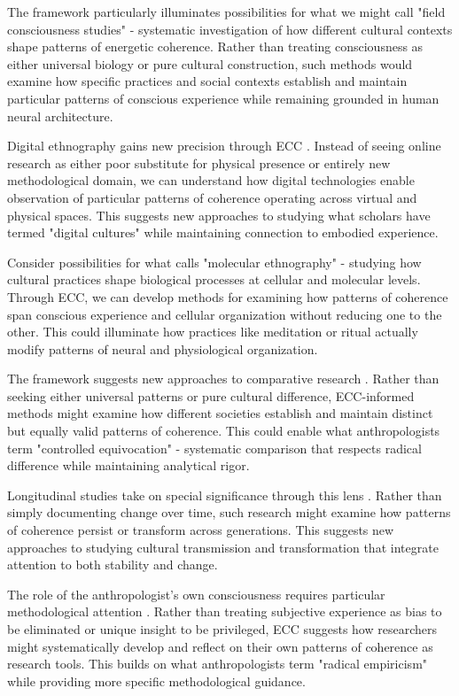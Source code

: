 The framework particularly illuminates possibilities for what we might call "field consciousness studies" \cite{myers2015rendering} - systematic investigation of how different cultural contexts shape patterns of energetic coherence. Rather than treating consciousness as either universal biology or pure cultural construction, such methods would examine how specific practices and social contexts establish and maintain particular patterns of conscious experience while remaining grounded in human neural architecture.

Digital ethnography gains new precision through ECC \cite{pink2016digital}. Instead of seeing online research as either poor substitute for physical presence or entirely new methodological domain, we can understand how digital technologies enable observation of particular patterns of coherence operating across virtual and physical spaces. This suggests new approaches to studying what scholars have termed "digital cultures" while maintaining connection to embodied experience.

Consider possibilities for what \cite{myers2015rendering} calls "molecular ethnography" - studying how cultural practices shape biological processes at cellular and molecular levels. Through ECC, we can develop methods for examining how patterns of coherence span conscious experience and cellular organization without reducing one to the other. This could illuminate how practices like meditation or ritual actually modify patterns of neural and physiological organization.

The framework suggests new approaches to comparative research \cite{marcus2012multi}. Rather than seeking either universal patterns or pure cultural difference, ECC-informed methods might examine how different societies establish and maintain distinct but equally valid patterns of coherence. This could enable what anthropologists term "controlled equivocation" - systematic comparison that respects radical difference while maintaining analytical rigor.

Longitudinal studies take on special significance through this lens \cite{strathern2004partial}. Rather than simply documenting change over time, such research might examine how patterns of coherence persist or transform across generations. This suggests new approaches to studying cultural transmission and transformation that integrate attention to both stability and change.

The role of the anthropologist's own consciousness requires particular methodological attention \cite{rabinow2011accompaniment}. Rather than treating subjective experience as bias to be eliminated or unique insight to be privileged, ECC suggests how researchers might systematically develop and reflect on their own patterns of coherence as research tools. This builds on what anthropologists term "radical empiricism" while providing more specific methodological guidance.

